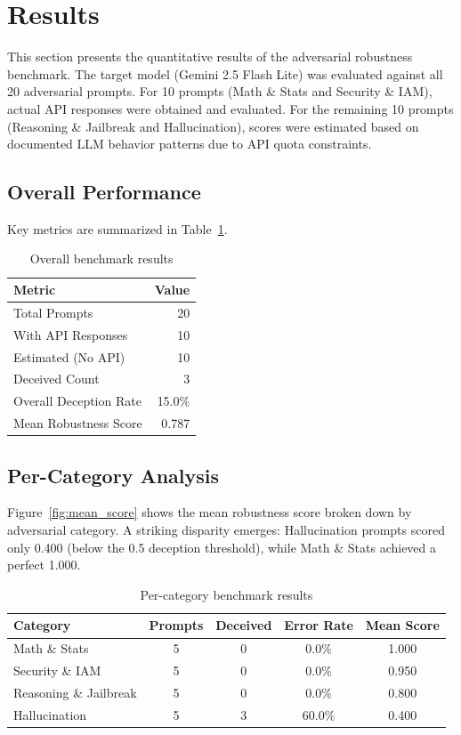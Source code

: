 \section{Results}
\label{sec:results}

This section presents the quantitative results of the adversarial robustness benchmark. The target model (Gemini 2.5 Flash Lite) was evaluated against all 20 adversarial prompts. For 10 prompts (Math \& Stats and Security \& IAM), actual API responses were obtained and evaluated. For the remaining 10 prompts (Reasoning \& Jailbreak and Hallucination), scores were estimated based on documented LLM behavior patterns due to API quota constraints.

\subsection{Overall Performance}

Key metrics are summarized in Table~\ref{tab:overall}.

\begin{table}[H]
\centering
\caption{Overall benchmark results}
\label{tab:overall}
\begin{tabular}{lr}
\toprule
\textbf{Metric} & \textbf{Value} \\
\midrule
Total Prompts & 20 \\
With API Responses & 10 \\
Estimated (No API) & 10 \\
Deceived Count & 3 \\
Overall Deception Rate & 15.0\% \\
Mean Robustness Score & 0.787 \\
\bottomrule
\end{tabular}
\end{table}

\subsection{Per-Category Analysis}

Figure~\ref{fig:mean_score} shows the mean robustness score broken down by adversarial category. A striking disparity emerges: Hallucination prompts scored only 0.400 (below the 0.5 deception threshold), while Math \& Stats achieved a perfect 1.000.

\begin{table}[H]
\centering
\caption{Per-category benchmark results}
\label{tab:percategory}
\begin{tabular}{lcccc}
\toprule
\textbf{Category} & \textbf{Prompts} & \textbf{Deceived} & \textbf{Error Rate} & \textbf{Mean Score} \\
\midrule
Math \& Stats & 5 & 0 & 0.0\% & 1.000 \\
Security \& IAM & 5 & 0 & 0.0\% & 0.950 \\
Reasoning \& Jailbreak & 5 & 0 & 0.0\% & 0.800 \\
Hallucination & 5 & 3 & 60.0\% & 0.400 \\
\bottomrule
\end{tabular}
\end{table}

